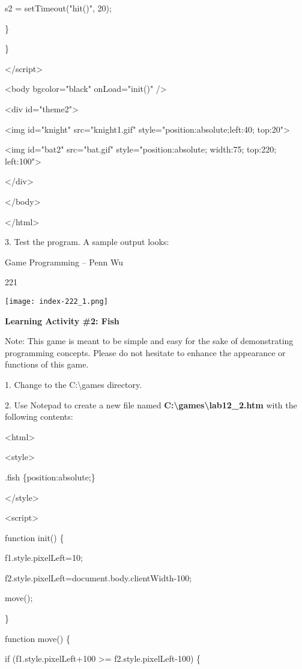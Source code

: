 \documentclass[
]{article}
\begin{document}
s2 = setTimeout("hit()", 20);

\}

\}

\textless/script\textgreater{}

\textless body bgcolor="black" onLoad="init()" /\textgreater{}

\textless div id="theme2"\textgreater{}

\textless img id="knight" src="knight1.gif"
style="position:absolute;left:40; top:20"\textgreater{}

\textless img id="bat2" src="bat.gif" style="position:absolute;
width:75; top:220; left:100"\textgreater{}

\textless/div\textgreater{}

\textless/body\textgreater{}

\textless/html\textgreater{}

3. Test the program. A sample output looks:

Game Programming -- Penn Wu

221

\protect\hypertarget{index_split_011.htmlux5cux23p222}{}{}\texttt{[image: index-222\_1.png]}

\textbf{Learning Activity \#2: Fish}

Note: This game is meant to be simple and easy for the sake of
demonstrating programming concepts. Please do not hesitate to enhance
the appearance or functions of this game.

1. Change to the C:\textbackslash games directory.

2. Use Notepad to create a new file named
\textbf{C:\textbackslash games\textbackslash lab12\_2.htm} with the
following contents:

\textless html\textgreater{}

\textless style\textgreater{}

.fish \{position:absolute;\}

\textless/style\textgreater{}

\textless script\textgreater{}

function init() \{

f1.style.pixelLeft=10;

f2.style.pixelLeft=document.body.clientWidth-100;

move();

\}

function move() \{

if (f1.style.pixelLeft+100 \textgreater= f2.style.pixelLeft-100) \{
\end{document}
